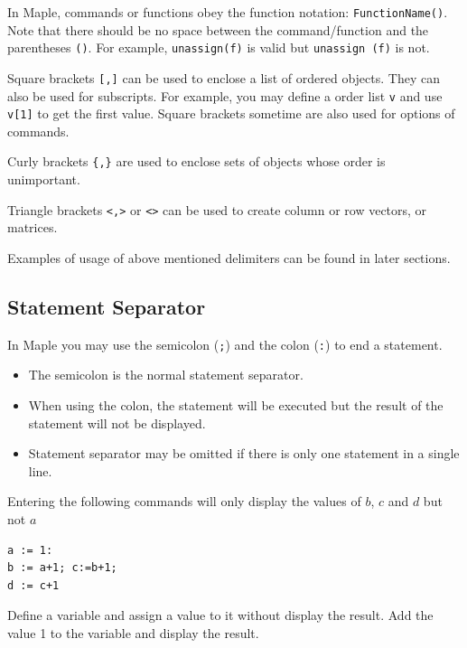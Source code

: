 \documentclass[
  12pt]{elegantbook}
\providecommand{\tightlist}{%
  \setlength{\itemsep}{0pt}\setlength{\parskip}{0pt}}
\begin{document}
In Maple, commands or functions obey the function notation: \texttt{FunctionName()}. Note that there should be no space between the command/function and the parentheses \texttt{()}. For example, \texttt{unassign(f)} is valid but \texttt{unassign\ (f)} is not.

Square brackets \texttt{{[},{]}} can be used to enclose a list of ordered objects. They can also be used for subscripts. For example, you may define a order list \texttt{v} and use \texttt{v{[}1{]}} to get the first value. Square brackets sometime are also used for options of commands.

Curly brackets \texttt{\{,\}} are used to enclose sets of objects whose order is unimportant.

Triangle brackets \texttt{\textless{},\textgreater{}} or \texttt{\textless{}\textbar{}\textgreater{}} can be used to create column or row vectors, or matrices.

Examples of usage of above mentioned delimiters can be found in later sections.

\hypertarget{statement-separator}{%
\subsection{Statement Separator}\label{statement-separator}}

In Maple you may use the semicolon (\texttt{;}) and the colon (\texttt{:}) to end a statement.

\begin{itemize}
\tightlist
\item
  The semicolon is the normal statement separator.
\item
  When using the colon, the statement will be executed but the result of the statement will not be displayed.
\item
  Statement separator may be omitted if there is only one statement in a single line.
\end{itemize}

\begin{example}

Entering the following commands will only display the values of \(b\), \(c\) and \(d\) but not \(a\)

\begin{verbatim}
a := 1:
b := a+1; c:=b+1;
d := c+1
\end{verbatim}

\end{example}

\begin{exercise}
Define a variable and assign a value to it without display the result. Add the value 1 to the variable and display the result.
\end{exercise}
\end{document}
